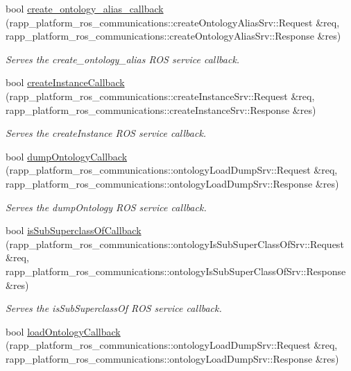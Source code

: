 \begin{DoxyCompactItemize}
bool \hyperlink{classKnowrobWrapperCommunications_a00791d76db809cb09c1f06fd38077c58}{create\-\_\-ontology\-\_\-alias\-\_\-callback} (rapp\-\_\-platform\-\_\-ros\-\_\-communications\-::create\-Ontology\-Alias\-Srv\-::\-Request \&req, rapp\-\_\-platform\-\_\-ros\-\_\-communications\-::create\-Ontology\-Alias\-Srv\-::\-Response \&res)
\begin{DoxyCompactList}\small\item\em Serves the create\-\_\-ontology\-\_\-alias R\-O\-S service callback. \end{DoxyCompactList}\item 
bool \hyperlink{classKnowrobWrapperCommunications_a1b1b3016fe4b7b5321fcbea3a268daa0}{create\-Instance\-Callback} (rapp\-\_\-platform\-\_\-ros\-\_\-communications\-::create\-Instance\-Srv\-::\-Request \&req, rapp\-\_\-platform\-\_\-ros\-\_\-communications\-::create\-Instance\-Srv\-::\-Response \&res)
\begin{DoxyCompactList}\small\item\em Serves the create\-Instance R\-O\-S service callback. \end{DoxyCompactList}\item 
bool \hyperlink{classKnowrobWrapperCommunications_a3be6c8a48ac43fd971d037c7da44ac8c}{dump\-Ontology\-Callback} (rapp\-\_\-platform\-\_\-ros\-\_\-communications\-::ontology\-Load\-Dump\-Srv\-::\-Request \&req, rapp\-\_\-platform\-\_\-ros\-\_\-communications\-::ontology\-Load\-Dump\-Srv\-::\-Response \&res)
\begin{DoxyCompactList}\small\item\em Serves the dump\-Ontology R\-O\-S service callback. \end{DoxyCompactList}\item 
bool \hyperlink{classKnowrobWrapperCommunications_a9323106f5ecb88147604eb12150d92a0}{is\-Sub\-Superclass\-Of\-Callback} (rapp\-\_\-platform\-\_\-ros\-\_\-communications\-::ontology\-Is\-Sub\-Super\-Class\-Of\-Srv\-::\-Request \&req, rapp\-\_\-platform\-\_\-ros\-\_\-communications\-::ontology\-Is\-Sub\-Super\-Class\-Of\-Srv\-::\-Response \&res)
\begin{DoxyCompactList}\small\item\em Serves the is\-Sub\-Superclass\-Of R\-O\-S service callback. \end{DoxyCompactList}\item 
bool \hyperlink{classKnowrobWrapperCommunications_aa7d046afb167ae2fa0658876bafa42ba}{load\-Ontology\-Callback} (rapp\-\_\-platform\-\_\-ros\-\_\-communications\-::ontology\-Load\-Dump\-Srv\-::\-Request \&req, rapp\-\_\-platform\-\_\-ros\-\_\-communications\-::ontology\-Load\-Dump\-Srv\-::\-Response \&res)

\end{DoxyCompactItemize}
